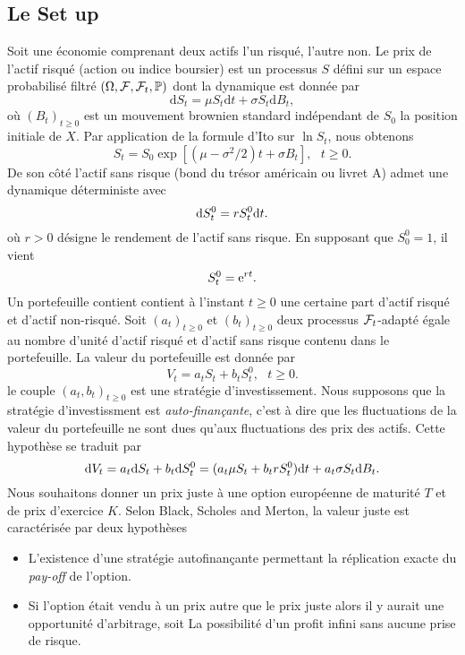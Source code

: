 \subsection{Le Set up}
Soit une économie comprenant deux actifs l'un risqué, l'autre non. Le prix de l'actif risqué (action ou indice boursier) est un processus $S$ défini sur un espace probabilisé filtré $(\Omega,\mathcal{F}, \mathcal{F}_t, \mathbb{P})$ dont la dynamique est donnée 
par 
$$
\text{d}S_t = \mu S_t\text{d}t + \sigma S_t \text{d}B_t,
$$ 
où $(B_t)_{t\geq 0}$ est un mouvement brownien standard indépendant de $S_0$ la position initiale de $X$. Par application de la formule d'Ito sur $\ln S_t$, nous obtenons 
$$
S_t = S_0\exp[(\mu - \sigma^2/2)t + \sigma B_t],\text{ }t\geq 0.
$$
De son côté l'actif sans risque (bond du trésor américain ou livret A) admet une dynamique déterministe avec 
$$
\text{d} S_t^0 = r S_t^0 \text{d} t.
$$
où $r>0$ désigne le rendement de l'actif sans risque. En supposant que $S^0_0 = 1$, il vient 
$$
S_t^0 = \mathrm{e}^{r t}. 
$$
Un portefeuille contient contient à l'instant $t\geq 0$ une certaine part d'actif risqué et d'actif non-risqué. Soit $(a_t)_{t\geq 0}$ et $(b_t)_{t\geq 0}$ deux processus $\mathcal{F}_t$-adapté égale au nombre d'unité d'actif risqué et d'actif sans risque contenu dans le portefeuille. La valeur du portefeuille est donnée par 
$$
V_t = a_t S_t + b_t S^0_t,\text{ }t\geq 0.
$$
le couple $(a_t, b_t)_{t\geq 0}$ est une stratégie d'investissement. Nous supposons que la stratégie d'investissment est \textit{auto-finançante}, c'est à dire que les fluctuations de la valeur du portefeuille ne sont dues qu'aux fluctuations des prix des actifs. Cette hypothèse se traduit par 
$$
\text{d} V_t = a_t \text{d} S_t + b_t \text{d} S^0_t = (a_t\mu S_t + b_tr S_t^0)\text{d} t  + a_t \sigma S_t \text{d} B_t.
$$
Nous souhaitons donner un prix juste à une option européenne de maturité $T$ et de prix d'exercice $K$. Selon Black, Scholes and Merton, la valeur juste est caractérisée par deux hypothèses
\begin{itemize}
    \item L'existence d'une stratégie autofinançante permettant la réplication exacte du \textit{pay-off} de l'option. 
    \item Si l'option était vendu à un prix autre que le prix juste alors il y aurait une opportunité d'arbitrage, soit La possibilité d'un profit infini sans aucune prise de risque.
\end{itemize}
